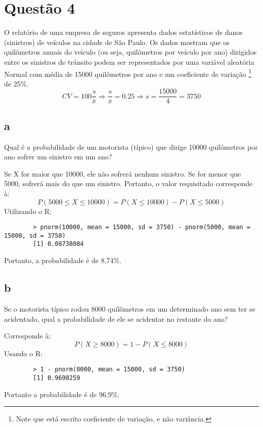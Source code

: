 \documentclass{article}[twocolumn]
\begin{document}
	\section{Quest\~ao 4}
	O relatório de uma empresa de seguros apresenta dados estatísticos de danos (sinistros)
	de veículos na cidade de São Paulo. Os dados mostram que os quilômetros anuais do
	veículo (ou seja, quilômetros por veículo por ano) dirigidos entre os sinistros de trânsito
	podem ser representados por uma variável aleatória Normal com média de 15000
	quilômetros por ano e um coeficiente de variação \footnote{Note que est\'a escrito coeficiente
	de varia\c{c}\~ao, e n\~ao vari\^ancia.}
	de 25\%.
	\begin{equation}
		CV = 100\frac{s}{\bar{x}} \Rightarrow \frac{s}{\bar{x}} = 0.25 \Rightarrow
		s = \frac{15000}{4} = 3750
	\end{equation}
	\subsection{a}
	Qual é a probabilidade de um motorista (típico) que dirige 10000 quilômetros por ano
	sofrer um sinistro em um ano?

	Se X for maior que 10000, ele n\~ao sofrer\'a nenhum sinistro. Se for menor que 5000, sofrer\'a
	mais do que um sinistro. Portanto, o valor requisitado corresponde \`a:
	\begin{equation}
		P(5000 \leq X \leq 10000) = P(X \leq 10000) - P(X \leq 5000)
		\nonumber
	\end{equation}
	Utilizando o R:
	\begin{verbatim}
		> pnorm(10000, mean = 15000, sd = 3750) - pnorm(5000, mean = 15000, sd = 3750)
		[1] 0.08738084
	\end{verbatim}
	Portanto, a probabilidade \'e de 8,74\%.
	\subsection{b}
	Se o motorista típico rodou 8000 quilômetros em um determinado ano sem ter se
	acidentado, qual a probabilidade de ele se acidentar no restante do ano?
	
	Corresponde \`a:
	\begin{equation}
		P(X \geq 8000) = 1 - P(X \leq 8000)
		\nonumber
	\end{equation}
	Usando o R:
	\begin{verbatim}
		> 1 - pnorm(8000, mean = 15000, sd = 3750)
		[1] 0.9690259
	\end{verbatim}
	Portanto a probabilidade \'e de 96,9\%.
\end{document}
